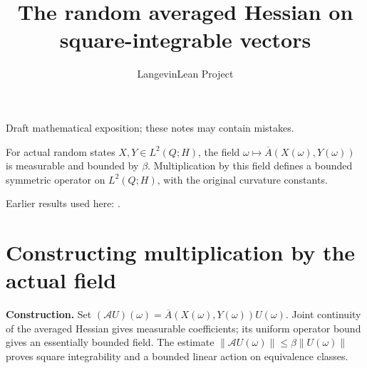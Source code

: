 \documentclass[11pt,a4paper]{article}
\title{\texorpdfstring{The random averaged Hessian on square-integrable vectors}{The random averaged Hessian on square-integrable vectors}}
\author{LangevinLean Project}
\date{}
\begin{document}
\maketitle
Draft mathematical exposition; these notes may contain mistakes.


For actual random states \(X,Y\in L^2(Q;H)\), the field \(\omega\mapsto\overline A(X(\omega),Y(\omega))\) is measurable and bounded by \(\beta\). Multiplication by this field defines a bounded symmetric operator on \(L^2(Q;H)\), with the original curvature constants.



Earlier results used here: \cite[Section~3.13]{LangevinLean2026ULASC}.

\section{\texorpdfstring{Constructing multiplication by the actual field}{Constructing multiplication by the actual field}}


\textbf{Construction.} Set \((\mathcal A U)(\omega)=\overline A(X(\omega),Y(\omega))U(\omega)\). Joint continuity of the averaged Hessian gives measurable coefficients; its uniform operator bound gives an essentially bounded field. The estimate \(\|\mathcal A U(\omega)\|\le\beta\|U(\omega)\|\) proves square integrability and a bounded linear action on equivalence classes.
\end{document}

